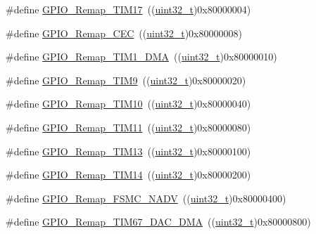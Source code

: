 \begin{DoxyCompactItemize}
\item 
\#define \hyperlink{group___g_p_i_o___remap__define_ga9fe98e01f8837d6a1ac4b4833f0fc45e}{G\+P\+I\+O\+\_\+\+Remap\+\_\+\+T\+I\+M17}~((\hyperlink{_p_e___types_8h_a33594304e786b158f3fb30289278f5af}{uint32\+\_\+t})0x80000004)
\item 
\#define \hyperlink{group___g_p_i_o___remap__define_gac5961690908d4a0737e82b5a7d271b9b}{G\+P\+I\+O\+\_\+\+Remap\+\_\+\+C\+EC}~((\hyperlink{_p_e___types_8h_a33594304e786b158f3fb30289278f5af}{uint32\+\_\+t})0x80000008)
\item 
\#define \hyperlink{group___g_p_i_o___remap__define_ga255adf908d7d530267707fee39ba2026}{G\+P\+I\+O\+\_\+\+Remap\+\_\+\+T\+I\+M1\+\_\+\+D\+MA}~((\hyperlink{_p_e___types_8h_a33594304e786b158f3fb30289278f5af}{uint32\+\_\+t})0x80000010)
\item 
\#define \hyperlink{group___g_p_i_o___remap__define_gadfed4d88bc9a4093d16ce64a85b6051a}{G\+P\+I\+O\+\_\+\+Remap\+\_\+\+T\+I\+M9}~((\hyperlink{_p_e___types_8h_a33594304e786b158f3fb30289278f5af}{uint32\+\_\+t})0x80000020)
\item 
\#define \hyperlink{group___g_p_i_o___remap__define_gac94252266a8fcb9ce7b55b5c55464110}{G\+P\+I\+O\+\_\+\+Remap\+\_\+\+T\+I\+M10}~((\hyperlink{_p_e___types_8h_a33594304e786b158f3fb30289278f5af}{uint32\+\_\+t})0x80000040)
\item 
\#define \hyperlink{group___g_p_i_o___remap__define_ga0f308f1bb45e4c473766603b4bef47f8}{G\+P\+I\+O\+\_\+\+Remap\+\_\+\+T\+I\+M11}~((\hyperlink{_p_e___types_8h_a33594304e786b158f3fb30289278f5af}{uint32\+\_\+t})0x80000080)
\item 
\#define \hyperlink{group___g_p_i_o___remap__define_ga72f5da86ed94f3be978cd841f7cd37cb}{G\+P\+I\+O\+\_\+\+Remap\+\_\+\+T\+I\+M13}~((\hyperlink{_p_e___types_8h_a33594304e786b158f3fb30289278f5af}{uint32\+\_\+t})0x80000100)
\item 
\#define \hyperlink{group___g_p_i_o___remap__define_gaa2ae554ed69ad3368c2cd7db678b3fd0}{G\+P\+I\+O\+\_\+\+Remap\+\_\+\+T\+I\+M14}~((\hyperlink{_p_e___types_8h_a33594304e786b158f3fb30289278f5af}{uint32\+\_\+t})0x80000200)
\item 
\#define \hyperlink{group___g_p_i_o___remap__define_ga97088efda8b8a057f4ba58de8f51625f}{G\+P\+I\+O\+\_\+\+Remap\+\_\+\+F\+S\+M\+C\+\_\+\+N\+A\+DV}~((\hyperlink{_p_e___types_8h_a33594304e786b158f3fb30289278f5af}{uint32\+\_\+t})0x80000400)
\item 
\#define \hyperlink{group___g_p_i_o___remap__define_gae69d46a269c2284c8cc6a90742e89b12}{G\+P\+I\+O\+\_\+\+Remap\+\_\+\+T\+I\+M67\+\_\+\+D\+A\+C\+\_\+\+D\+MA}~((\hyperlink{_p_e___types_8h_a33594304e786b158f3fb30289278f5af}{uint32\+\_\+t})0x80000800)

\end{DoxyCompactItemize}
